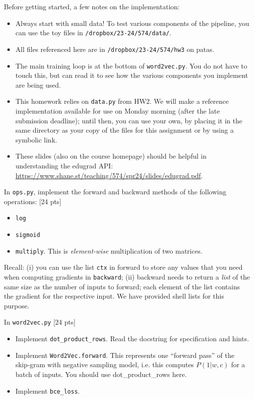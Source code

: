 \documentclass[11pt]{article}
\begin{document}
Before getting started, a few notes on the implementation:
\begin{itemize}
  \item Always start with small data!  To test various components of the pipeline, you can use the toy files in \texttt{/dropbox/23-24/574/data/}.
  \item All files referenced here are in \texttt{/dropbox/23-24/574/hw3} on patas.
  \item The main training loop is at the bottom of \texttt{word2vec.py}.  You do not have to touch this, but can read it to see how the various components you implement are being used.
  \item This homework relies on \texttt{data.py} from HW2. We will make a reference implementation available for use on Monday morning (after the late submission deadline); until then, you can use your own, by placing it in the same directory as your copy of the files for this assignment or by using a symbolic link.
  \item These slides (also on the course homepage) should be helpful in understanding the edugrad API: \url{https://www.shane.st/teaching/574/spr24/slides/edugrad.pdf}.  
\end{itemize}

\vspace{2em}
 In \texttt{ops.py}, implement the forward and backward methods of the following operations: [24 pts]
\begin{itemize}
  \item \texttt{log}
  \item \texttt{sigmoid}
  \item \texttt{multiply}.  This is \emph{element-wise} multiplication of two matrices.
\end{itemize}
Recall: (i) you can use the list \texttt{ctx} in forward to store any values that you need when computing gradients in \texttt{backward}; (ii) backward needs to return a \emph{list} of the same size as the number of inputs to forward; each element of the list contains the gradient for the respective input.  We have provided shell lists for this purpose.

\vspace{2em}
 In \texttt{word2vec.py} [24 pts]
\begin{itemize}
  \item Implement \texttt{dot\_product\_rows}.  Read the docstring for specification and hints.
  \item Implement \texttt{Word2Vec.forward}.  This represents one ``forward pass'' of the skip-gram with negative sampling model, i.e. this computes $P(1 | w, c)$ for a batch of inputs.  You should use dot\_product\_rows here.
  \item Implement \texttt{bce\_loss}.
\end{itemize}
\end{document}
